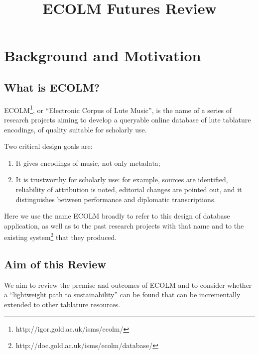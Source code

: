 \documentclass[twocolumn,10pt]{paper}
\begin{document}
\title{ECOLM Futures Review}

\maketitle
\begin{sloppypar}
  
  
  \section{Background and Motivation}
  
  \subsection{What is ECOLM?}

  ECOLM\footnote{http://igor.gold.ac.uk/isms/ecolm/}, or ``Electronic
  Corpus of Lute Music'', is the name of a series of research projects
  aiming to develop a queryable online database of lute tablature
  encodings, of quality suitable for scholarly use.

  Two critical design goals are:
  
  \begin{enumerate}
  \item It gives encodings of music, not only metadata;
  \item It is trustworthy for scholarly use: for example, sources are
    identified, reliability of attribution is noted, editorial changes
    are pointed out, and it distinguishes between performance and
    diplomatic transcriptions.
  \end{enumerate}
  
  Here we use the name ECOLM broadly to refer to this design of
  database application, as well as to the past research projects with
  that name and to the existing
  system\footnote{http://doc.gold.ac.uk/isms/ecolm/database/} that
  they produced.

  \subsection{Aim of this Review}

  We aim to review the premise and outcomes of ECOLM and to consider
  whether a ``lightweight path to sustainability'' can be found that
  can be incrementally extended to other tablature resources.


\end{sloppypar}
\end{document}
